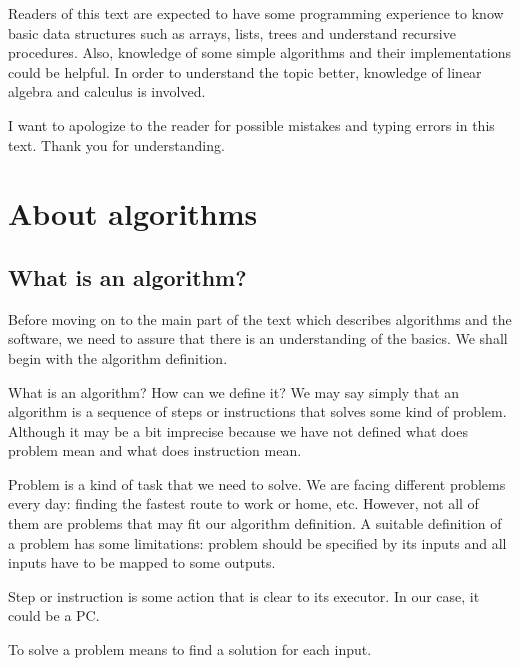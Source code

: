 \documentclass[
  field=inf,
  biblatex,
  language=english,
  glossaries,
  theorems=false,
  sourcecodes=false,
  index
]{kidiplom}
\begin{document}
Readers of this text are expected to have some programming experience to know basic data structures such as arrays, lists, trees and understand recursive procedures. Also, knowledge of some simple algorithms and their implementations could be helpful. In order to understand the topic better, knowledge of linear algebra and calculus is involved.

I want to apologize to the reader for possible mistakes and typing errors in this text. Thank you for understanding.

\newpage
\section{About algorithms}
\subsection{What is an algorithm?}

Before moving on to the main part of the text which describes algorithms and the software, we need to assure that there is an understanding of the basics. We shall begin with the algorithm definition.

What is an algorithm? How can we define it? We may say simply that an algorithm is a sequence of steps or instructions that solves some kind of problem. Although it may be a bit imprecise because we have not defined what does problem mean and what does instruction mean.

Problem is a kind of task that we need to solve. We are facing different problems every day: finding the fastest route to work or home, etc. However, not all of them are problems that may fit our algorithm definition. A suitable definition of a problem has some limitations: problem should be specified by its inputs and all inputs have to be mapped to some outputs.

Step or instruction is some action that is clear to its executor. In our case, it could be a PC.

To solve a problem means to find a solution for each input.
\end{document}
